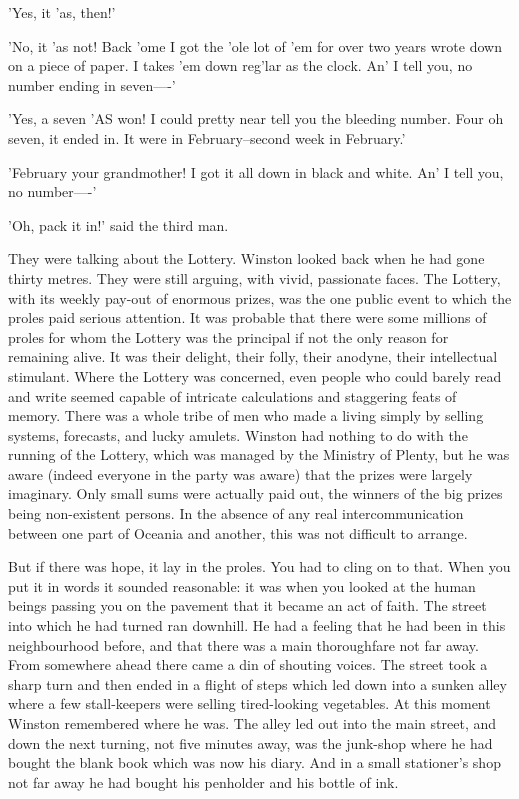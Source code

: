 \documentclass{article}
\begin{document}
'Yes, it 'as, then!'

'No, it 'as not! Back 'ome I got the 'ole lot of 'em for over two years
wrote down on a piece of paper. I takes 'em down reg'lar as the clock. An'
I tell you, no number ending in seven----'

'Yes, a seven 'AS won! I could pretty near tell you the bleeding number.
Four oh seven, it ended in. It were in February--second week in February.'

'February your grandmother! I got it all down in black and white. An' I
tell you, no number----'

'Oh, pack it in!' said the third man.

They were talking about the Lottery. Winston looked back when he had gone
thirty metres. They were still arguing, with vivid, passionate faces.
The Lottery, with its weekly pay-out of enormous prizes, was the one public
event to which the proles paid serious attention. It was probable that
there were some millions of proles for whom the Lottery was the principal
if not the only reason for remaining alive. It was their delight, their
folly, their anodyne, their intellectual stimulant. Where the Lottery was
concerned, even people who could barely read and write seemed capable of
intricate calculations and staggering feats of memory. There was a whole
tribe of men who made a living simply by selling systems, forecasts, and
lucky amulets. Winston had nothing to do with the running of the Lottery,
which was managed by the Ministry of Plenty, but he was aware (indeed
everyone in the party was aware) that the prizes were largely imaginary.
Only small sums were actually paid out, the winners of the big prizes being
non-existent persons. In the absence of any real intercommunication between
one part of Oceania and another, this was not difficult to arrange.

But if there was hope, it lay in the proles. You had to cling on to that.
When you put it in words it sounded reasonable: it was when you looked at
the human beings passing you on the pavement that it became an act of
faith. The street into which he had turned ran downhill. He had a feeling
that he had been in this neighbourhood before, and that there was a main
thoroughfare not far away. From somewhere ahead there came a din of
shouting voices. The street took a sharp turn and then ended in a flight
of steps which led down into a sunken alley where a few stall-keepers
were selling tired-looking vegetables. At this moment Winston remembered
where he was. The alley led out into the main street, and down the next
turning, not five minutes away, was the junk-shop where he had bought the
blank book which was now his diary. And in a small stationer's shop not
far away he had bought his penholder and his bottle of ink.
\end{document}
